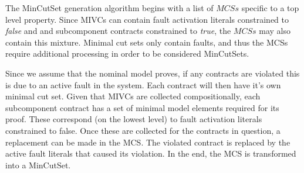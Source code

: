 The MinCutSet generation algorithm begins with a list of $MCSs$ specific to a top level property. Since MIVCs can contain fault activation literals constrained to \textit{false} and and subcomponent contracts constrained to \textit{true}, the $MCSs$ may also contain this mixture. Minimal cut sets only contain faults, and thus the MCSs require additional processing in order to be considered MinCutSets.

Since we assume that the nominal model proves, if any contracts are violated this is due to an active fault in the system. Each contract will then have it's own minimal cut set. Given that MIVCs are collected compositionally, each subcomponent contract has a set of minimal model elements required for its proof. These correspond (on the lowest level) to fault activation literals constrained to false. Once these are collected for the contracts in question, a replacement can be made in the MCS. The violated contract is replaced by the active fault literals that caused its violation. In the end, the MCS is transformed into a MinCutSet.




